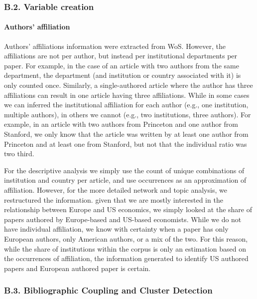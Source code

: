 \documentclass[
  12pt,
  onecolumn]{article}
\begin{document}
\hypertarget{b.2.-variable-creation}{%
\subsubsection*{B.2. Variable creation}\label{b.2.-variable-creation}}

\hypertarget{author-affiliation}{%
\paragraph*{Authors' affiliation}\label{author-affiliation}}

Authors' affiliations information were extracted from WoS. However, the
affiliations are not per author, but instead per institutional
departments per paper. For example, in the case of an article with two
authors from the same department, the department (and institution or
country associated with it) is only counted once. Similarly, a
single-authored article where the author has three affiliations can
result in one article having three affiliations. While in some cases we
can inferred the institutional affiliation for each author (e.g., one
institution, multiple authors), in others we cannot (e.g., two
institutions, three authors). For example, in an article with two
authors from Princeton and one author from Stanford, we only know that
the article was written by at least one author from Princeton and at
least one from Stanford, but not that the individual ratio was two
third.

For the descriptive analysis we simply use the count of unique
combinations of institution and country per article, and use occurrences
as an approximation of affiliation. However, for the more detailed
network and topic analysis, we restructured the information. given that
we are mostly interested in the relationship between Europe and US
economics, we simply looked at the share of papers authored by
Europe-based and US-based economists. While we do not have individual
affiliation, we know with certainty when a paper has only European
authors, only American authors, or a mix of the two. For this reason,
while the share of institutions within the corpus is only an estimation
based on the occurrences of affiliation, the information generated to
identify US authored papers and European authored paper is certain.

\hypertarget{network}{%
\subsubsection*{B.3. Bibliographic Coupling and Cluster
Detection}\label{network}}
\end{document}
